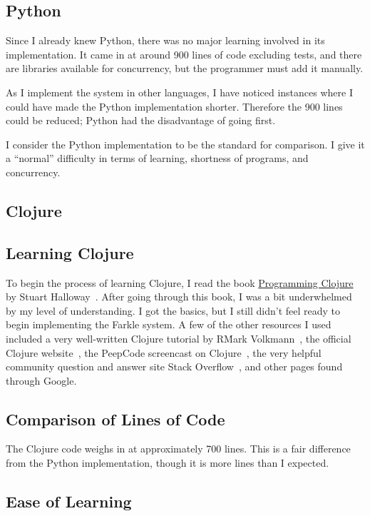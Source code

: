 \documentclass{article}
\begin{document}
\subsection{Python}

Since I already knew Python, there was no major learning involved in its
implementation.  It came in at around 900 lines of code excluding tests, and
there are libraries available for concurrency, but the programmer must add it
manually.

As I implement the system in other languages, I have noticed instances where I
could have made the Python implementation shorter.  Therefore the 900 lines
could be reduced; Python had the disadvantage of going first.

I consider the Python implementation to be the standard for comparison.  I give
it a ``normal'' difficulty in terms of learning, shortness of programs, and
concurrency.

\subsection{Clojure}

\subsection{Learning Clojure}

To begin the process of learning Clojure, I read the book \underline{Programming
Clojure} by Stuart Halloway~\cite{clojurebook}.  After going through this book,
I was a bit underwhelmed by my level of understanding.  I got the basics, but I
still didn't feel ready to begin implementing the Farkle system.  A few of the
other resources I used included a very well-written Clojure tutorial by R\. Mark
Volkmann~\cite{clojuretutorial}, the official Clojure
website~\cite{clojuredotorg}, the PeepCode screencast on
Clojure~\cite{peepcodeclojure}, the very helpful community question and answer
site Stack Overflow~\cite{stackoverflow}, and other pages found through Google.

\subsection{Comparison of Lines of Code}

The Clojure code weighs in at approximately 700 lines.  This is a fair
difference from the Python implementation, though it is more lines than I
expected.

\subsection{Ease of Learning}
\end{document}
